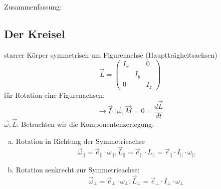 \documentclass[a4paper,10pt]{scrartcl}
\begin{document}
\begin{seg}{Zusammenfassung:}
 \fixme[fehlt]
\end{seg}

\subsection{Der Kreisel}
starrer Körper  symmetrisch um Figurenachse (Hauptträgheitsachsen)\\
\[
 \vec L=\begin{pmatrix} I_x & & 0 \\ & I_y & \\ 0 & & I_z  \end{pmatrix}
\]
für Rotation eine Figurenachsen:
\[
 \to \vec L || \vec \omega, \vec M=0=\frac{d\vec{L}}{dt}
\]
$\vec \omega, \vec L$: Betrachten wir die Komponentenzerlegung:
\begin{enumerate}[a)]
 \item Rotation in Richtung der Symmetrieachse
\[
 \vec \omega_{||}=\vec e_{||} \cdot \omega_{||}, \vec L_{||}=\vec e_{||} \cdot L_{||}= \vec e_{||} \cdot I_{||}\cdot \omega_{||}
\]
\item Rotation senkrecht zur Symmetrieachse:
\[
 \vec \omega_\perp=\vec e_\perp \cdot \omega_\perp; \vec L_\perp=\vec e_\perp \cdot I_\perp\cdot \omega_\perp
\]
\end{enumerate}
\end{document}
